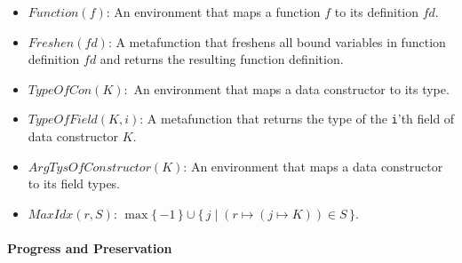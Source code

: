 \documentclass[showabstract,showacknowledgments,showpreface,showdedication,school]{iuphd}
\theoremstyle{nonumberplain}
\newcommand{\keywd}[1]{\mathit{#1}}
\newcommand{\skeywd}[1]{\mathit{#1}}
\newcommand{\FD}{\keywd{fd}}
\newcommand{\DC}{\keywd{K}}
\newcommand{\reg}{\skeywd{r}}
\newcommand{\indj}{\keywd{j}}
\newcommand{\STOR}{\keywd{S}}
\newcommand\set[1]{\{ \, \ensuremath{#1} \,\}}
\newcommand{\allocptr}[2]{\keywd{MaxIdx}(#1,#2)}
\newcommand{\il}[1]{\lstinline[style=inline,mathescape=true];#1;}
\begin{document}
\begin{itemize}
\item $Function(f)$: An environment that maps a function $f$ to its definition $\FD$.

\item $Freshen(\FD)$: A metafunction that freshens all bound variables in function definition
$\FD$ and returns the resulting function definition.

\item $TypeOfCon(\DC):$ An environment that maps a data constructor to its type.

\item $TypeOfField(\DC,i)$: A metafunction that returns the type of the \il{i}'th field
of data constructor $\DC$.

\item $ArgTysOfConstructor(\DC)$: An environment that maps a data constructor to its field types.

\item $\allocptr{\reg}{\STOR}$: $\max \set{-1} \cup \set{ \indj \; | \; {(\reg \mapsto (\indj \mapsto \DC)) \in \STOR}}$.
\end{itemize}











































\paragraph{Progress and Preservation}
\label{proof:typesafety}
\end{document}
